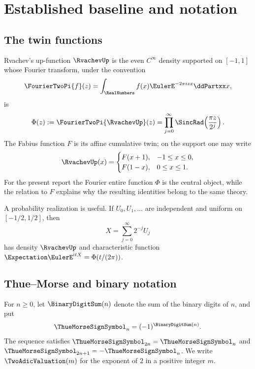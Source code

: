 \documentclass[11pt]{article}
\numberwithin{equation}{section}
\theoremstyle{definition}
\theoremstyle{remark}
\begin{document}
\section{Established baseline and notation}

\subsection{The twin functions}

Rvachev's up-function $\RvachevUp$ is the even $C^\infty$ density supported on $[-1,1]$ whose Fourier transform, under the convention
\[
 \FourierTwoPi{f}(z)=\int_{\RealNumbers}f(x)\EulerE^{-2\pi i z x}\ddPartxx x,
\]
is
\begin{equation}\label{p7:eq:Phi-sinc}
 \Phi(z):=\FourierTwoPi{\RvachevUp}(z)
 =\prod_{j=0}^{\infty}\SincRad\!\left(\frac{\pi z}{2^j}\right).
\end{equation}
The Fabius function $F$ is its affine cumulative twin; on the support one may write
\[
 \RvachevUp(x)=
 \begin{cases}
 F(x+1),&-1\le x\le0,\\
 F(1-x),&0\le x\le1.
 \end{cases}
\]
For the present report the Fourier entire function $\Phi$ is the central object, while the relation to $F$ explains why the resulting identities belong to the same theory.

A probability realization is useful.  If $U_0,U_1,\ldots$ are independent and uniform on $[-1/2,1/2]$, then
\begin{equation}\label{p7:eq:prob-sum}
 X=\sum_{j=0}^{\infty}2^{-j}U_j
\end{equation}
has density $\RvachevUp$ and characteristic function $\Expectation\EulerE^{itX}=\Phi(t/(2\pi))$.

\subsection{Thue--Morse and binary notation}

For $n\ge0$, let $\BinaryDigitSum(n)$ denote the sum of the binary digits of $n$, and put
\begin{equation}\label{p7:eq:tm}
 \ThueMorseSignSymbol_n=(-1)^{\BinaryDigitSum(n)}.
\end{equation}
The sequence satisfies $\ThueMorseSignSymbol_{2n}=\ThueMorseSignSymbol_n$ and $\ThueMorseSignSymbol_{2n+1}=-\ThueMorseSignSymbol_n$.  We write $\TwoAdicValuation(m)$ for the exponent of $2$ in a positive integer $m$.
\end{document}
